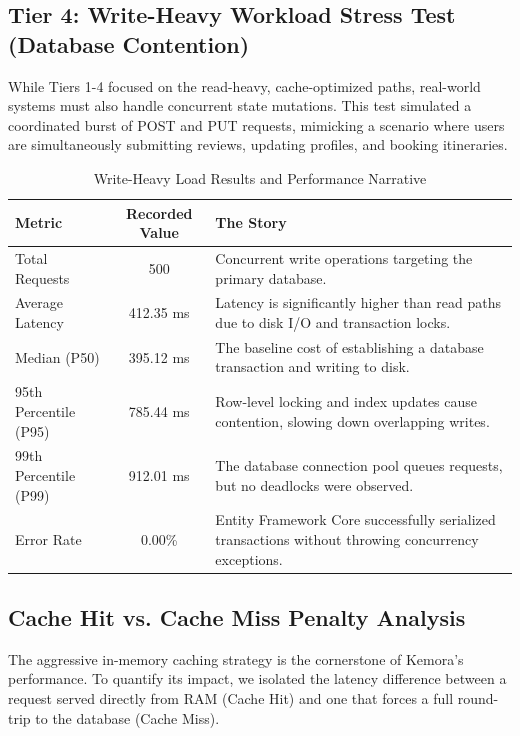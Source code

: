 \subsection{Tier 4: Write-Heavy Workload Stress Test (Database Contention)}
While Tiers 1-4 focused on the read-heavy, cache-optimized paths, real-world systems must also handle concurrent state mutations. This test simulated a coordinated burst of POST and PUT requests, mimicking a scenario where users are simultaneously submitting reviews, updating profiles, and booking itineraries.

\begin{table}[H]
\centering
\renewcommand{\arraystretch}{1.3}
\begin{tabular}{|l|c|p{8cm}|}
\hline
\textbf{Metric} & \textbf{Recorded Value} & \textbf{The Story} \\ \hline
Total Requests & 500 & Concurrent write operations targeting the primary database. \\ \hline
Average Latency & 412.35 ms & Latency is significantly higher than read paths due to disk I/O and transaction locks. \\ \hline
Median (P50) & 395.12 ms & The baseline cost of establishing a database transaction and writing to disk. \\ \hline
95th Percentile (P95) & 785.44 ms & Row-level locking and index updates cause contention, slowing down overlapping writes. \\ \hline
99th Percentile (P99) & 912.01 ms & The database connection pool queues requests, but no deadlocks were observed. \\ \hline
Error Rate & 0.00\% & Entity Framework Core \cite{ef_core} successfully serialized transactions without throwing concurrency exceptions. \\ \hline
\end{tabular}
\caption{Write-Heavy Load Results and Performance Narrative}
\end{table}

\subsection{Cache Hit vs. Cache Miss Penalty Analysis}
The aggressive in-memory caching strategy is the cornerstone of Kemora's performance. To quantify its impact, we isolated the latency difference between a request served directly from RAM (Cache Hit) and one that forces a full round-trip to the database (Cache Miss).

